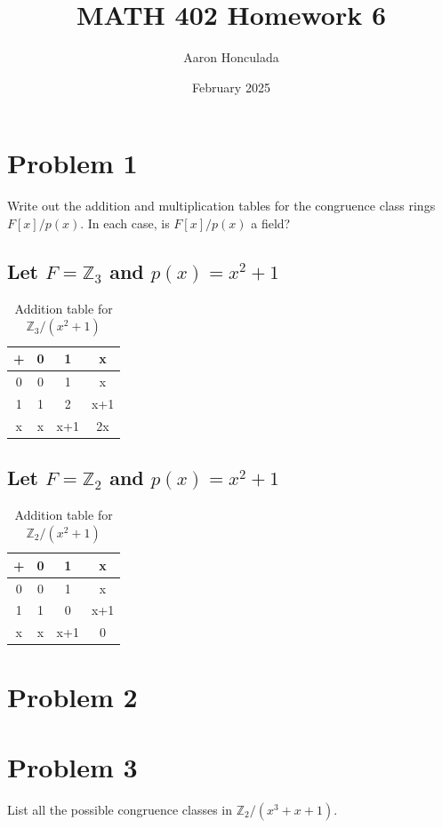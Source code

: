 \documentclass{article}
\title{MATH 402 Homework 6}
\author{Aaron Honculada}
\date{February 2025}
\begin{document}
\maketitle

\section{Problem 1}
Write out the addition and multiplication tables for the congruence class rings $F[x]/p(x)$. In each case, is $F[x]/p(x)$ a field?

\subsection{Let $F = \mathbb{Z}_3$ and $p(x) = x^2 + 1$}

\begin{table}[h]
    \centering
    \begin{tabular}{c|ccc}
        + & 0 & 1 & x \\
        \hline
        0 & 0 & 1 & x \\
        1 & 1 & 2 & x+1 \\
        x & x & x+1 & 2x \\
    \end{tabular}
    \caption{Addition table for \(\mathbb{Z}_3 / (x^2+1)\)}
\end{table}


\subsection{Let $F = \mathbb{Z}_2$ and $p(x) = x^2 + 1$}

\begin{table}[h]
    \centering
    \begin{tabular}{c|ccc}
        + & 0 & 1 & x \\
        \hline
        0 & 0 & 1 & x \\
        1 & 1 & 0 & x+1 \\
        x & x & x+1 & 0 \\
    \end{tabular}
    \caption{Addition table for \(\mathbb{Z}_2 / (x^2+1)\)}
\end{table}

\section{Problem 2}

\section{Problem 3}
List all the possible congruence classes in \(\mathbb{Z}_2 / (x^3 + x + 1)\).
\end{document}
